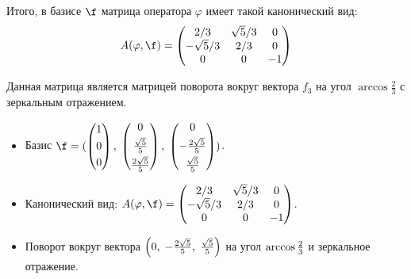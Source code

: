 Итого, в базисе $\f$ матрица оператора $\varphi$ имеет такой канонический вид:
\[
    A(\varphi, \f) =
    \begin{pmatrix}
        2/3         & \sqrt{5}/3 & 0  \\
        -\sqrt{5}/3 & 2/3        & 0  \\
        0           & 0          & -1
    \end{pmatrix}
\]

Данная матрица является матрицей поворота вокруг вектора $f_3$ на угол $\arccos{\frac{2}{3}}$ с зеркальным отражением.

\begin{itemize}
    \item Базис
          $
              \f =
              (
              \begin{pmatrix}
                  1 \\[1mm]
                  0 \\[1mm]
                  0
              \end{pmatrix}, \;
              \begin{pmatrix}
                  0               \\[1mm]
                  \d{\sqrt{5}}{5} \\[1mm]
                  \d{2 \sqrt{5}}{5}
              \end{pmatrix}, \;
              \begin{pmatrix}
                  0                  \\[1mm]
                  -\d{2 \sqrt{5}}{5} \\[1mm]
                  \d{\sqrt{5}}{5}
              \end{pmatrix}
              )
          $.

    \item Канонический вид:
          $
              A(\varphi, \f)
              =
              \begin{pmatrix}
                  2/3         & \sqrt{5}/3 & 0  \\
                  -\sqrt{5}/3 & 2/3        & 0  \\
                  0           & 0          & -1
              \end{pmatrix}
          $.

    \item Поворот вокруг вектора $\left(0,\; -\frac{2 \sqrt{5}}{5},\; \frac{\sqrt{5}}{5}\right)$ на угол $\arccos{\frac{2}{3}}$ и зеркальное отражение.
\end{itemize}
